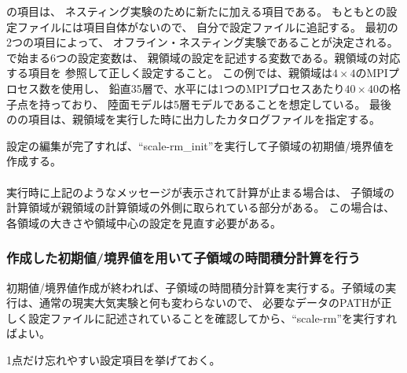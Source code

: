 の項目は、
ネスティング実験のために新たに加える項目である。
もともとの設定ファイルには項目自体がないので、
自分で設定ファイルに追記する。
最初の2つの項目によって、
オフライン・ネスティング実験であることが決定される。
で始まる6つの設定変数は、
親領域の設定を記述する変数である。親領域の対応する項目を
参照して正しく設定すること。
この例では、親領域は$4 \times 4$のMPIプロセス数を使用し、
鉛直35層で、水平には1つのMPIプロセスあたり$40 \times 40$の格子点を持っており、
陸面モデルは5層モデルであることを想定している。
最後のの項目は、親領域を実行した時に出力したカタログファイルを指定する。

設定の編集が完了すれば、``scale-rm\_init''を実行して子領域の初期値/境界値を作成する。\\

\\

\noindent 実行時に上記のようなメッセージが表示されて計算が止まる場合は、
子領域の計算領域が親領域の計算領域の外側に取られている部分がある。
この場合は、各領域の大きさや領域中心の設定を見直す必要がある。


\subsubsection{作成した初期値/境界値を用いて子領域の時間積分計算を行う}
初期値/境界値作成が終われば、子領域の時間積分計算を実行する。子領域の実行は、通常の現実大気実験と何も変わらないので、
必要なデータのPATHが正しく設定ファイルに記述されていることを確認してから、``scale-rm''を実行すればよい。

1点だけ忘れやすい設定項目を挙げておく。\\

\\

